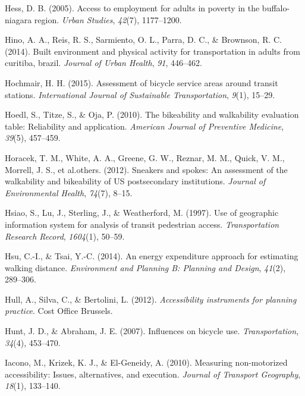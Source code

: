 \documentclass[
11pt, %
oneside, %
english, %
singlespacing, %
]{macthesis} %
\newlength{\cslhangindent}
\newenvironment{CSLReferences}[2] %
 {%
  \setlength{\parindent}{0pt}
  \ifodd #1 \everypar{\setlength{\hangindent}{\cslhangindent}}\ignorespaces\fi
  \ifnum #2 > 0
  \setlength{\parskip}{#2\baselineskip}
  \fi
 }%
 {}
\begin{document}
\begin{CSLReferences}{1}{0}
\leavevmode{}%
Hess, D. B. (2005). Access to employment for adults in poverty in the buffalo-niagara region. \emph{Urban Studies}, \emph{42}(7), 1177--1200.

\leavevmode{}%
Hino, A. A., Reis, R. S., Sarmiento, O. L., Parra, D. C., \& Brownson, R. C. (2014). Built environment and physical activity for transportation in adults from curitiba, brazil. \emph{Journal of Urban Health}, \emph{91}, 446--462.

\leavevmode{}%
Hochmair, H. H. (2015). Assessment of bicycle service areas around transit stations. \emph{International Journal of Sustainable Transportation}, \emph{9}(1), 15--29.

\leavevmode{}%
Hoedl, S., Titze, S., \& Oja, P. (2010). The bikeability and walkability evaluation table: Reliability and application. \emph{American Journal of Preventive Medicine}, \emph{39}(5), 457--459.

\leavevmode{}%
Horacek, T. M., White, A. A., Greene, G. W., Reznar, M. M., Quick, V. M., Morrell, J. S., et al.others. (2012). Sneakers and spokes: An assessment of the walkability and bikeability of US postsecondary institutions. \emph{Journal of Environmental Health}, \emph{74}(7), 8--15.

\leavevmode{}%
Hsiao, S., Lu, J., Sterling, J., \& Weatherford, M. (1997). Use of geographic information system for analysis of transit pedestrian access. \emph{Transportation Research Record}, \emph{1604}(1), 50--59.

\leavevmode{}%
Hsu, C.-I., \& Tsai, Y.-C. (2014). An energy expenditure approach for estimating walking distance. \emph{Environment and Planning B: Planning and Design}, \emph{41}(2), 289--306.

\leavevmode{}%
Hull, A., Silva, C., \& Bertolini, L. (2012). \emph{Accessibility instruments for planning practice}. Cost Office Brussels.

\leavevmode{}%
Hunt, J. D., \& Abraham, J. E. (2007). Influences on bicycle use. \emph{Transportation}, \emph{34}(4), 453--470.

\leavevmode{}%
Iacono, M., Krizek, K. J., \& El-Geneidy, A. (2010). Measuring non-motorized accessibility: Issues, alternatives, and execution. \emph{Journal of Transport Geography}, \emph{18}(1), 133--140.


\end{CSLReferences}
\end{document}
